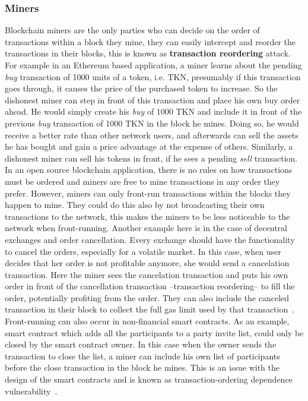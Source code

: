 \subsubsection{Miners}
Blockchain miners are the only parties who can decide on the order of transactions within a block they mine, they can easily intercept and reorder the transactions in their blocks, this is known as \textbf{transaction reordering} attack.  For example in an Ethereum based application, a miner learns about the pending \textit{buy} transaction of 1000 units of a token, i.e. TKN, presumably if this transaction goes through, it causes the price of the purchased token to increase. So the dishonest miner can step in front of this transaction and place his own buy order ahead. He would simply create his \textit{buy} of 1000 TKN and include it in front of the previous \textit{buy} transaction of 1000 TKN in the block he mines. Doing so, he would receive a better rate than other network users, and afterwards can sell the assets he has bought and gain a price advantage at the expense of others. Similarly, a dishonest miner can sell his tokens in front, if he sees a pending \textit{sell} transaction. In an open source blockchain application, there is no rules on how transactions must be ordered and miners are free to mine transactions in any order they prefer. However, miners can only front-run transactions within the blocks they happen to mine. They could do this also by not broadcasting their own transactions to the network, this makes the miners to be less noticeable to the network when front-running.
Another example here is in the case of decentral exchanges and order cancellation. Every exchange should have the functionality to cancel the orders, especially for a volatile market. In this case, when user decides that her order is not profitable anymore, she would send a cancelation transaction. Here the miner sees the cancelation transaction and puts his own order in front of the cancellation transaction --transaction reordering-- to fill the order, potentially profiting from the order. They can also include the canceled transaction in their block to collect the full gas limit used by that transaction~\cite{CostofDecentralization:online}. Front-running can also occur in non-financial smart contracts. As an example, smart contract which adds all the participants to a party invite list, could only be closed by the smart contract owner. In this case when the owner sends the transaction to close the list, a miner can include his own list of participants before the close transaction in the block he mines. This is an issue with the design of the smart contracts and is known as transaction-ordering dependence vulnerability~\cite{luu2016making}. 

